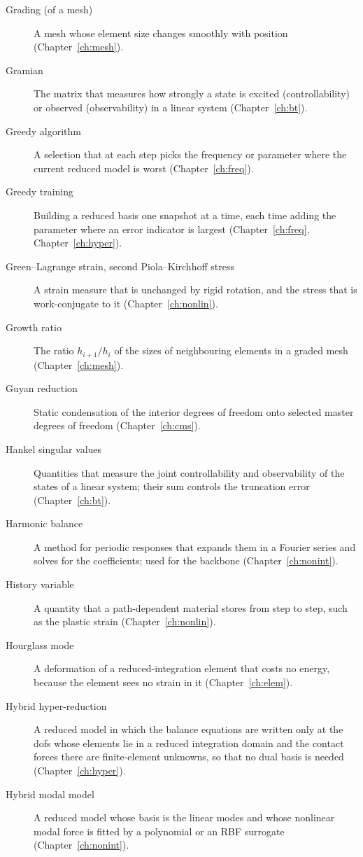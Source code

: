 \begin{description}
\item[Grading (of a mesh)] A mesh whose element size changes smoothly with position (Chapter~\ref{ch:mesh}).
\item[Gramian] The matrix that measures how strongly a state is excited (controllability) or observed (observability) in a linear system (Chapter~\ref{ch:bt}).
\item[Greedy algorithm] A selection that at each step picks the frequency or parameter where the current reduced model is worst (Chapter~\ref{ch:freq}).
\item[Greedy training] Building a reduced basis one snapshot at a time, each time adding the parameter where an error indicator is largest (Chapter~\ref{ch:freq}, Chapter~\ref{ch:hyper}).
\item[Green--Lagrange strain, second Piola--Kirchhoff stress] A strain measure that is unchanged by rigid rotation, and the stress that is work-conjugate to it (Chapter~\ref{ch:nonlin}).
\item[Growth ratio] The ratio $h_{i+1}/h_i$ of the sizes of neighbouring elements in a graded mesh (Chapter~\ref{ch:mesh}).
\item[Guyan reduction] Static condensation of the interior degrees of freedom onto selected master degrees of freedom (Chapter~\ref{ch:cms}).
\item[Hankel singular values] Quantities that measure the joint controllability and observability of the states of a linear system; their sum controls the truncation error (Chapter~\ref{ch:bt}).
\item[Harmonic balance] A method for periodic responses that expands them in a Fourier series and solves for the coefficients; used for the backbone (Chapter~\ref{ch:nonint}).
\item[History variable] A quantity that a path-dependent material stores from step to step, such as the plastic strain (Chapter~\ref{ch:nonlin}).
\item[Hourglass mode] A deformation of a reduced-integration element that costs no energy, because the element sees no strain in it (Chapter~\ref{ch:elem}).
\item[Hybrid hyper-reduction] A reduced model in which the balance equations are written only at the dofs whose elements lie in a reduced integration domain and the contact forces there are finite-element unknowns, so that no dual basis is needed (Chapter~\ref{ch:hyper}).
\item[Hybrid modal model] A reduced model whose basis is the linear modes and whose nonlinear modal force is fitted by a polynomial or an RBF surrogate (Chapter~\ref{ch:nonint}).

\end{description}
